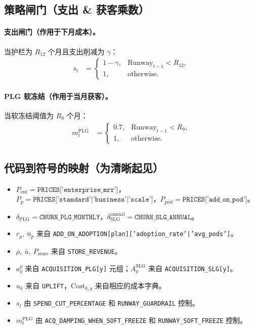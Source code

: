 \documentclass[11pt, a4paper, oneside]{article}
\begin{document}
\subsection{策略闸门（支出 \& 获客乘数）}
\paragraph{支出闸门（作用于下月成本）。}
当护栏为 $R_{12}$ 个月且支出削减为 $\gamma$：
\begin{align}
s_t 
  &= 
  \begin{cases}
    1-\gamma, & \mathrm{Runway}_{t-1} < R_{12},\\
    1, & \text{otherwise.}
  \end{cases}
\end{align}

\paragraph{PLG 软冻结（作用于当月获客）。}
当软冻结阈值为 $R_{9}$ 个月：
\begin{align}
m^{\mathrm{PLG}}_t 
  &= 
  \begin{cases}
    0.7, & \mathrm{Runway}_{t-1} < R_{9},\\
    1, & \text{otherwise.}
  \end{cases}
\end{align}

\subsection{代码到符号的映射（为清晰起见）}
\begin{itemize}
  \item $P_{\mathrm{ent}} = \texttt{PRICES['enterprise\_mrr']}$，$P_p=\texttt{PRICES['standard'|'business'|'scale']}$，$P_{\mathrm{pod}}=\texttt{PRICES['add\_on\_pod']}$。
  \item $\delta_{\mathrm{PLG}}=\texttt{CHURN\_PLG\_MONTHLY}$，$\delta^{\mathrm{annual}}_{\mathrm{SLG}}=\texttt{CHURN\_SLG\_ANNUAL}$。
  \item $r_p,\ \bar{n}_p$ 来自 \texttt{ADD\_ON\_ADOPTION[plan]['adoption\_rate'|'avg\_pods']}。
  \item $\rho,\ \bar{u},\ P_{\mathrm{store}}$ 来自 \texttt{STORE\_REVENUE}。
  \item $a^p_y$ 来自 \texttt{ACQUISITION\_PLG[y]} 元组；$A^{\mathrm{SLG}}_y$ 来自 \texttt{ACQUISITION\_SLG[y]}。
  \item $u_k$ 来自 \texttt{UPLIFT}，$\mathrm{Cost}_{k,y}$ 来自相应的成本字典。
  \item $s_t$ 由 \texttt{SPEND\_CUT\_PERCENTAGE} 和 \texttt{RUNWAY\_GUARDRAIL} 控制。
  \item $m^{\mathrm{PLG}}_t$ 由 \texttt{ACQ\_DAMPING\_WHEN\_SOFT\_FREEZE} 和 \texttt{RUNWAY\_SOFT\_FREEZE} 控制。
\end{itemize}
\end{document}
